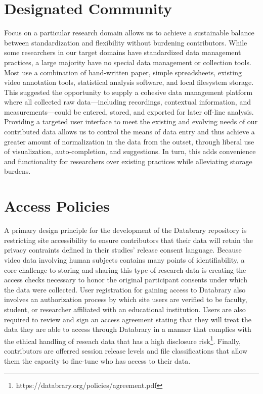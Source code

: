 \documentclass{sig-alternate}
\begin{document}
\section{Designated Community}

Focus on a particular research domain allows us to achieve a sustainable balance between standardization and flexibility without burdening contributors.
While some researchers in our target domains have standardized data management practices, a large majority have no special data management or collection tools.
Most use a combination of hand-written paper, simple spreadsheets, existing video annotation tools, statistical analysis software, and local filesystem storage.
This suggested the opportunity to supply a cohesive data management platform where all collected raw data---including recordings, contextual information, and measurements---could be entered, stored, and exported for later off-line analysis.
Providing a targeted user interface to meet the existing and evolving needs of our contributed data allows us to control the means of data entry and thus achieve a greater amount of normalization in the data from the outset, through liberal use of visualization, auto-completion, and suggestions.
In turn, this adds convenience and functionality for researchers over existing practices while alleviating storage burdens.

\section{Access Policies}

A primary design principle for the development of the Databrary repository is restricting site accessibility to ensure contributors that their data will retain the privacy contraints defined in their studies' release consent language. 
Because video data involving human subjects contains many points of identifiability, a core challenge to storing and sharing this type of research data is creating the access checks necessary to honor the original participant consents under which the data were collected. 
User registration for gaining access to Databrary also involves an authorization process by which site users are verified to be faculty, student, or researcher affiliated with an educational institution.
Users are also required to review and sign an access agreement stating that they will treat the data they are able to access through Databrary in a manner that complies with the ethical handling of reseach data that has a high disclosure risk\footnote{https://databrary.org/policies/agreement.pdf}.
Finally, contributors are offerred session release levels and file classifications that allow them the capacity to fine-tune who has access to their data. 
\end{document}
